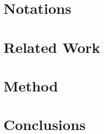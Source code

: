 \documentclass[harvard]{lincolncsthesis}
\begin{document}

\maketitle

% 

% 

% 

\thesisBodyStart



% 

\chapter{Notations}


\chapter{Related Work}


\chapter{Method}


\chapter{Conclusions}




\printReferences

\printLudography

\end{document}
